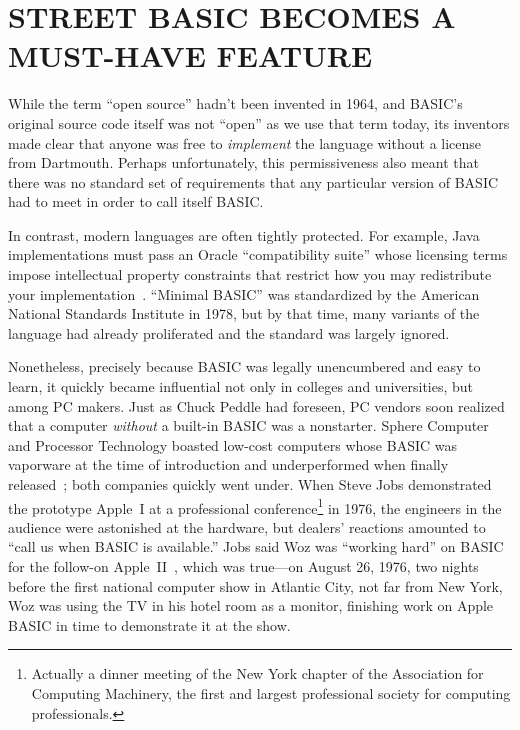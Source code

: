
\section{STREET BASIC BECOMES A MUST-HAVE FEATURE}


While the term ``open source'' hadn't been invented in 1964, and BASIC's
original source code itself was not ``open'' as we use that term today, its
inventors made clear that anyone was free to \emph{implement} the language
without a license from Dartmouth.
Perhaps unfortunately, this permissiveness also meant that there was
no standard set of requirements that any particular version of BASIC
had to meet in order to call itself BASIC.


\begin{tangent}{}
In contrast, modern languages are often tightly protected.
For example, Java implementations must pass an Oracle ``compatibility
suite'' whose licensing terms impose intellectual property constraints
that restrict how you may redistribute your
implementation~\cite{apache-java-letter,apache-resigns-jcp}.
 ``Minimal BASIC'' was standardized by the American
National Standards Institute in 1978, but by that time, many variants
of the language had already proliferated and the standard was largely ignored.
\end{tangent}

Nonetheless, precisely because BASIC was legally unencumbered and easy to learn, it quickly became
influential not only in colleges and universities, but among PC
makers.
Just as Chuck Peddle had foreseen, PC vendors soon realized that a
computer \emph{without} a built-in BASIC was a nonstarter.
Sphere Computer and Processor Technology boasted low-cost computers
whose BASIC was vaporware at the time of introduction and
underperformed when finally released~\cite[p. 114, 134]{veit}; both
companies quickly went under.
When Steve Jobs demonstrated the prototype Apple~I at a
professional conference\footnote{Actually a dinner meeting of the New York chapter
of the Association for Computing Machinery, the first and largest
professional society for computing professionals.} in
1976, the engineers in the audience were astonished at the hardware, but
dealers' reactions amounted to ``call us when BASIC is available.''
Jobs said Woz was ``working hard'' on BASIC for the follow-on
Apple~II~\cite[pp. 92ff]{veit}, which was true---on August 26, 1976,
two nights before the first national computer show in Atlantic City,
not far from New York, Woz was using the TV in  his hotel room as a
monitor,  finishing work on Apple BASIC in time to demonstrate it at the show.

